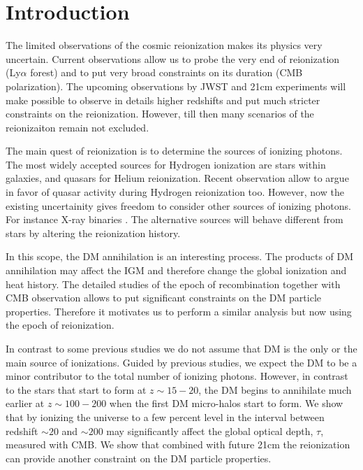 \section{Introduction}

The limited observations of the cosmic reionization makes its physics very uncertain. Current observations allow us to probe the very end of reionization (Ly$\alpha$ forest) and to put very broad constraints on its duration (CMB polarization). The upcoming observations by JWST and 21cm experiments will make possible to observe in details higher redshifts and put much stricter constraints on the reionization. However, till then many scenarios of the reionizaiton remain not excluded.

The main quest of reionization is to determine the sources of ionizing photons. The most widely accepted sources for Hydrogen ionization are stars within galaxies, and quasars for Helium reionization. Recent observation allow \cite{2015arXiv150707678M} to argue in favor of quasar activity during Hydrogen reionization too. However, now the existing uncertainity gives freedom to consider other sources of ionizing photons. For instance X-ray binaries \cite{Fialkov_2014}. The alternative sources will behave different from stars by altering the reionization history. 

In this scope, the DM annihilation is an interesting process. The products of DM annihilation may affect the IGM and therefore change the global ionization and heat history. The detailed studies of the epoch of recombination together with CMB observation allows \cite{2015arXiv150603811S} to put significant constraints on the DM particle properties. Therefore it motivates us to perform a similar analysis but now using the epoch of reionization. 

In contrast to some previous studies \cite{2009JCAP...10..009C, 2009PhRvD..80c5007B} we do not assume that DM is the only or the main source of ionizations. Guided by previous studies, we expect the DM to be a minor contributor to the total number of ionizing photons. However, in contrast to the stars that start to form at $z\sim 15-20$, the DM begins to annihilate much earlier at $z\sim100-200$ when the first DM micro-halos start to form. We show that by ionizing the universe to a few percent level in the interval between redshift $\sim20$ and $\sim200$ may significantly affect the global optical depth, $\tau$, measured with CMB. We show that combined with future 21cm the reionization can provide another constraint on the DM particle properties.


